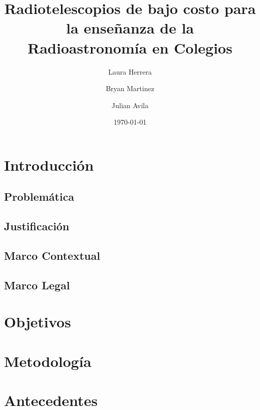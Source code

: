 \documentclass[sn-mathphys]{svmono}
\title{\Huge \textbf{Radiotelescopios de bajo costo para la enseñanza de la Radioastronomía en Colegios}}
\author{Laura Herrera \and Bryan Martinez \and Julian Avila}
\date{\today}
\begin{document}
\maketitle

\tableofcontents

\newpage

\chapter{Introducción}
\section{Problemática}


\section{Justificación}


\section{Marco Contextual}


\section{Marco Legal}


\chapter{Objetivos}


\chapter{Metodología}


\chapter{Antecedentes}


\printbibliography
\end{document}
